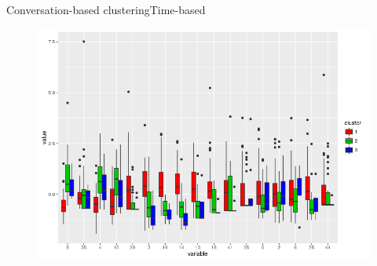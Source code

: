 \documentclass{beamer}
\begin{document}
\begin{frame}{Conversation-based clustering}{Time-based}
	\begin{figure}
		\centering
		\includegraphics[width=1\textwidth]{cluster_whiskers}
	\end{figure}	
\end{frame}
\end{document}
